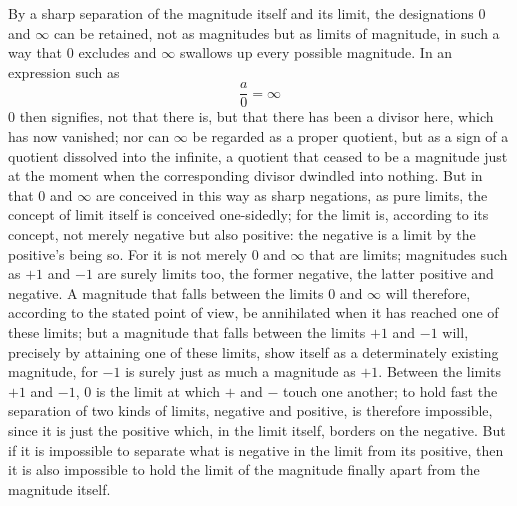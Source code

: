 \documentclass[12pt,a4paper,openany]{book}
\newcommand{\opage}[1]{\marginnote{\footnotesize\textit{[#1]}}}
\begin{document}
By a sharp separation of the magnitude itself and its limit, the designations $0$ and $\infty$ can be retained, not as magnitudes but as limits of magnitude, in such a way that $0$ excludes and $\infty$ swallows up every possible magnitude. In an expression such as
\[ \frac{a}{0}=\infty \]
$0$ then signifies, not that there is, but that there has been a divisor here, which has now vanished; nor can $\infty$ be regarded as a proper quotient, but as a sign of a quotient dissolved into the infinite, a quotient that ceased to be a magnitude just at the moment when the corresponding divisor dwindled into nothing. But in that $0$ and $\infty$ are conceived in this way as sharp negations, as pure limits, the concept of limit itself is conceived one-sidedly; for the limit is, according to its concept, not merely negative but also positive: the negative is a limit by the positive's being so. For it is not merely $0$ and $\infty$ that are limits; magnitudes such as $+1$ and $-1$ are surely limits too, the former negative, the latter positive and negative. A magnitude that falls between the limits $0$ and $\infty$ will therefore, according to the stated point of view, be annihilated when it has reached %
\setcounter{footnote}{0}%
\opage{71}one of these limits; but a magnitude that falls between the limits $+1$ and $-1$ will, precisely by attaining one of these limits, show itself as a determinately existing magnitude, for $-1$ is surely just as much a magnitude as $+1$. Between the limits $+1$ and $-1$, $0$ is the limit at which $+$ and $-$ touch one another; to hold fast the separation of two kinds of limits, negative and positive, is therefore impossible, since it is just the positive which, in the limit itself, borders on the negative. But if it is impossible to separate what is negative in the limit from its positive, then it is also impossible to hold the limit of the magnitude finally apart from the magnitude itself.
\end{document}
